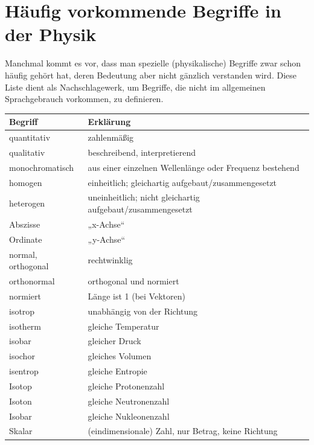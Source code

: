 \section*{Häufig vorkommende Begriffe in der Physik}\label{sec: haeufige_Begriffe_Physik}
Manchmal kommt es vor, dass man spezielle (physikalische) Begriffe zwar schon häufig gehört hat, deren Bedeutung aber nicht gänzlich verstanden wird. Diese Liste dient als Nachschlagewerk, um Begriffe, die nicht im allgemeinen Sprachgebrauch vorkommen, zu definieren. 
\vspace{0.3cm}
\begin{center}
  \begin{tabularx}{0.9\textwidth}{l X} 
    \toprule
    \textbf{Begriff} & \textbf{Erklärung} \\
    \midrule
    quantitativ & zahlenmäßig \\
    qualitativ & beschreibend, interpretierend \\
    monochromatisch & aus einer einzelnen Wellenlänge oder Frequenz bestehend \\
    homogen & einheitlich; gleichartig aufgebaut/zusammengesetzt \\
    heterogen & uneinheitlich; nicht gleichartig aufgebaut/zusammengesetzt \\
    Abszisse & „x-Achse“ \\
    Ordinate & „y-Achse“ \\
    normal, orthogonal & rechtwinklig \\
    orthonormal & orthogonal und normiert \\
    normiert & Länge ist 1 (bei Vektoren) \\
    isotrop & unabhängig von der Richtung \\
    isotherm & gleiche Temperatur \\
    isobar & gleicher Druck \\
    isochor & gleiches Volumen \\
    isentrop & gleiche Entropie \\
    Isotop & gleiche Protonenzahl \\
    Isoton & gleiche Neutronenzahl \\
    Isobar & gleiche Nukleonenzahl \\
    Skalar & (eindimensionale) Zahl, nur Betrag, keine Richtung \\

\end{tabularx}
\end{center}
